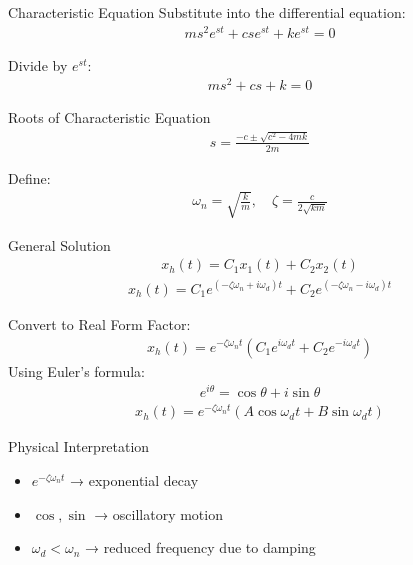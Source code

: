 \documentclass{beamer}
\begin{document}
\begin{frame}{Characteristic Equation}
Substitute into the differential equation:
\begin{align}
ms^2 e^{st} + cs e^{st} + k e^{st} = 0
\end{align}

Divide by $e^{st}$:
\begin{align}
ms^2 + cs + k = 0
\end{align}
\end{frame}

\begin{frame}{Roots of Characteristic Equation}
\begin{align}
s = \frac{-c \pm \sqrt{c^2 - 4mk}}{2m}
\end{align}

Define:
\begin{align}
\omega_n = \sqrt{\frac{k}{m}}, \quad
\zeta = \frac{c}{2\sqrt{km}}
\end{align}
\end{frame}


\begin{frame}{General Solution}
\begin{align}
x_h(t) = C_1 x_{1}(t)
+ C_2 x_{2}(t)
\end{align}
\begin{align}
x_h(t) = C_1 e^{(-\zeta \omega_n + i\omega_d)t}
+ C_2 e^{(-\zeta \omega_n - i\omega_d)t}
\end{align}
\end{frame}

\begin{frame}{Convert to Real Form}
Factor:
\begin{align}
x_h(t) = e^{-\zeta \omega_n t}
\left(C_1 e^{i\omega_d t} + C_2 e^{-i\omega_d t}\right)
\end{align}
Using Euler’s formula:
\begin{align}
e^{i\theta} = \cos\theta + i\sin\theta
\end{align}
\begin{align}
x_h(t) = e^{-\zeta \omega_n t}
\left(A \cos \omega_d t + B \sin \omega_d t\right)
\end{align}
\end{frame}

\begin{frame}{Physical Interpretation}
\begin{itemize}
    \item $e^{-\zeta \omega_n t}$ → exponential decay
    \item $\cos, \sin$ → oscillatory motion
    \item $\omega_d < \omega_n$ → reduced frequency due to damping
\end{itemize}
\end{frame}
\end{document}
